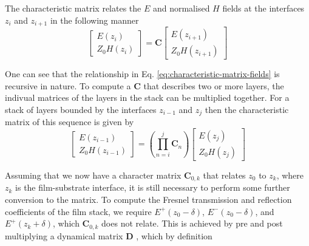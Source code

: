\documentclass[10pt,a4paper,portrait]{report}
\begin{document}
\noindent
The characteristic matrix relates the $E$ and normalised $H$ fields at the interfaces $z_i$ and $z_{i+1}$ in the following manner
\begin{equation}
\label{eq:characteristic-matrix-fields}
\begin{bmatrix}
  E\left(z_i\right) \\
  Z_0 H \left( z_i \right)
\end{bmatrix} =
\mathbf{C}
\begin{bmatrix}
  E \left(z_{i+1}\right) \\
  Z_0 H \left(z_{i+1}\right) 
\end{bmatrix}
\end{equation}

\noindent
One can see that the relationship in Eq. \ref{eq:characteristic-matrix-fields} is recursive in nature. 
To compute a $\mathbf{C}$ that describes two or more layers, the indivual matrices of the layers in the stack can be multiplied together.
For a stack of layers bounded by the interfaces $z_{i-1}$ and $z_j$ then the characteristic matrix of this sequence is given by
\begin{equation}\label{characteristic-matrix-fields-global}
\begin{bmatrix}
  E\left(z_{i-1}\right) \\
  Z_0 H \left( z_{i-1} \right)
\end{bmatrix} =
\left( \prod\limits_{n=i}^{j} \mathbf{C}_n \right)
\begin{bmatrix}
  E \left(z_j\right) \\
  Z_0 H \left(z_j\right) 
\end{bmatrix}
\end{equation}

\noindent
Assuming that we now have a character matrix $\mathbf{C}_{0,k}$ that relates $z_0$ to $z_k$, where $z_k$ is the film-substrate interface, it is still necessary to perform some further conversion to the matrix. To compute the Fresnel transmission and reflection coefficients of the film stack, we require $E^+\left( z_0 - \delta \right)$, $E^-\left( z_0 - \delta \right)$, and $E^+\left( z_k + \delta \right)$, which $\mathbf{C}_{0,k}$ does not relate. This is achieved by pre and post multiplying a dynamical matrix $\mathbf{D}$  \cite{katsidis_general_2002}, which by definition
\end{document}
